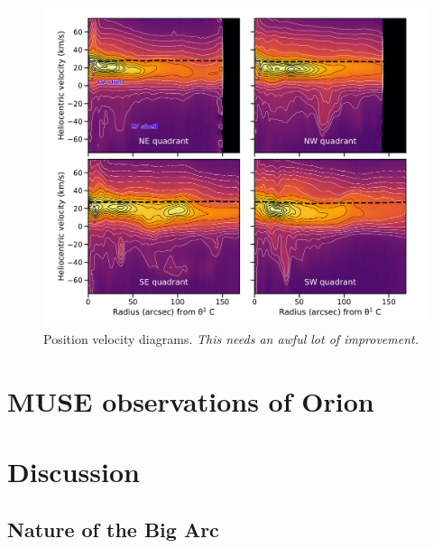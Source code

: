 \documentclass[useAMS, usenatbib]{mnras}
\newcounter{ionstage}
\renewcommand{\ion}[2]{\setcounter{ionstage}{#2}%
  \ensuremath{\mathrm{#1\,\scriptstyle\Roman{ionstage}}}}
\begin{document}
\begin{figure}
  \includegraphics[width=\linewidth]{figs/v-hist-quadrant-oiii-annotated}
  \caption{Position velocity diagrams. \textit{This needs an awful lot of improvement.}}
  \label{fig:v-hist-quadrant}
\end{figure}

\section{MUSE observations of Orion}
\label{sec:muse-observ-orion}





\section{Discussion}
\label{sec:discussion}


\subsection{Nature of the Big Arc}
\label{sec:nature-big-arc}
\end{document}
